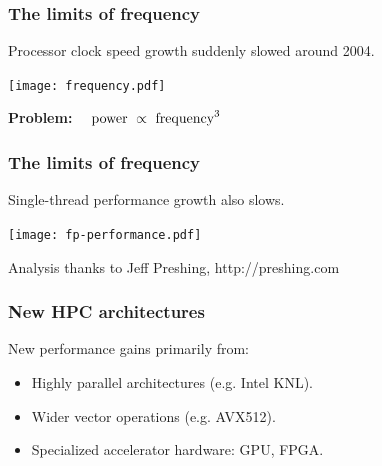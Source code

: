 \documentclass[aspectratio=43,12pt]{beamer}
\begin{document}
\begin{frame}
\frametitle{The limits of frequency}

\vfill
Processor clock speed growth suddenly slowed around 2004.

\vfill
\texttt{[image: frequency.pdf]}

\vfill
\centering
\textbf{Problem:} $\quad\hbox{power}\ \propto\ \hbox{frequency}^3$

\vfill
\end{frame}


\begin{frame}
\frametitle{The limits of frequency}
\vfill
Single-thread performance growth also slows.

\vfill
\texttt{[image: fp-performance.pdf]}

\vfill
\hfill{\scriptsize Analysis thanks to Jeff Preshing, http://preshing.com}
\end{frame}

\begin{frame}
\frametitle{New HPC architectures}

\vfill
New performance gains primarily from:

\vfill
\begin{itemize}
\item Highly parallel architectures (e.g. Intel KNL).
\item Wider vector operations (e.g. AVX512).
\item Specialized accelerator hardware: GPU, FPGA.
\end{itemize}

\vfill
\end{frame}
\end{document}

